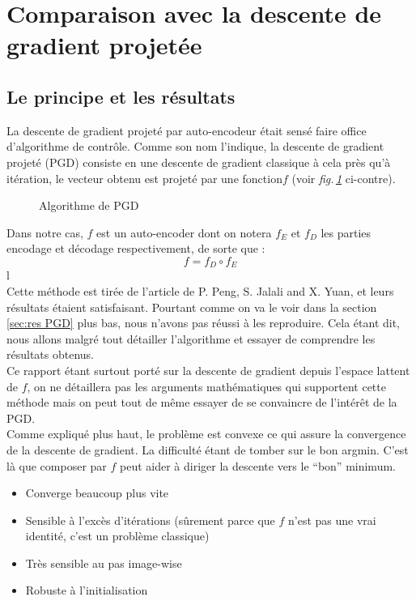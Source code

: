 \documentclass[hidelinks, french]{article} %
\newcommand{\figref}[1]{\textit{fig.\,\ref{#1}}}
\theoremstyle{enonce}
\theoremstyle{special}
\theoremstyle{rq}
\theoremstyle{exo}
\theoremstyle{demo}
\begin{document}
\newpage



\section{Comparaison avec la descente de gradient projetée}\label{sec:comparPGD}

\subsection{Le principe et les résultats}\label{sec:PGD}
\quad 

La descente de gradient projeté par auto-encodeur était sensé faire office d'algorithme de contrôle. Comme son nom l'indique, la descente de gradient projeté (PGD) consiste en une descente de gradient classique à cela près qu'à itération, le vecteur obtenu est projeté par une fonction$f$ (voir \figref{fig:pcode PGD} ci-contre). 

\begin{figure}
    
    \caption{Algorithme de PGD}
    \label{fig:pcode PGD}
\end{figure}
\noindent Dans notre cas, $f$ est un auto-encoder dont on notera $f_E$ et $f_D$ les parties encodage et décodage respectivement, de sorte que :
\[f = f_D\circ f_E\]{\color{white}l}
\\
Cette méthode est tirée de l'article \cite{peng_solving_2019} de P. Peng, S. Jalali and X. Yuan, et leurs résultats étaient satisfaisant. Pourtant comme on va le voir dans la section \ref{sec:res PGD} plus bas, nous n'avons pas réussi à les reproduire.
Cela étant dit, nous allons malgré tout détailler l'algorithme et essayer de comprendre les résultats obtenus.
\\
Ce rapport étant surtout porté sur la descente de gradient depuis l'espace lattent de $f$, on ne détaillera pas les arguments mathématiques qui supportent cette méthode mais on peut tout de même essayer de se convaincre de l'intérêt de la PGD.\\
Comme expliqué plus haut, le problème est convexe ce qui assure la convergence de la descente de gradient. La difficulté étant de tomber sur le bon argmin. C'est là que composer par $f$ peut aider à diriger la descente vers le ``bon'' minimum.


\begin{itemize}
	\item Converge beaucoup plus vite
	\item Sensible à l'excès d'itérations (sûrement parce que $f$ n'est pas une vrai identité, c'est un problème classique)
	\item Très sensible au pas image-wise
	\item Robuste à l'initialisation
\end{itemize}
\\ \\
\end{document}
